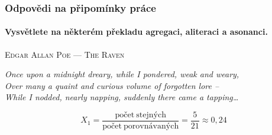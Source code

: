 \documentclass[12pt,xcolor=usenames,dvipsnames]{beamer}
\begin{document}

\begin{frame}[fragile]
	\frametitle{Odpovědi na připomínky práce}
	\framesubtitle{Vysvětlete na některém překladu agregaci, aliteraci a \textbf{asonanci}.}

	{
		\begin{center}
			\textsc{Edgar Allan Poe --- The Raven}
		
			{\small \emph{Once upon a midnight dreary, while I pondered, weak and weary,\\
		Over many a quaint and curious volume of forgotten lore --\\
		While I nodded, nearly napping, suddenly there came a tapping\ldots}}
	
		\end{center}
	}
\pause



\vspace{-25pt}
\begin{equation*}
X_1 = \frac{\mathrm{počet\ stejných}}{\mathrm{počet\ porovnávaných}} = \frac{5}{21} \approx 0{,}24
\end{equation*}


\end{frame}	
\end{document}
